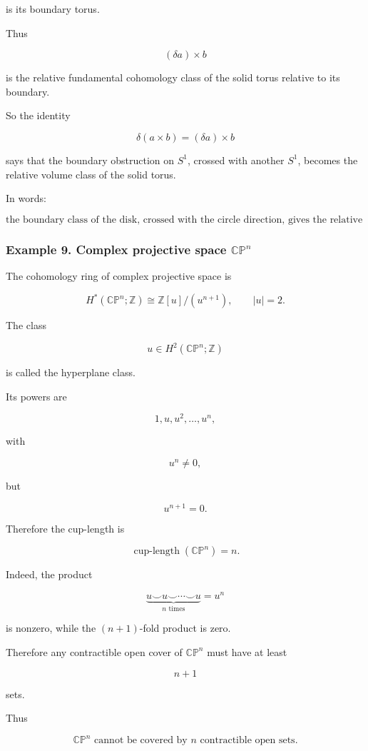 \documentclass[12pt,a4paper]{article}
\theoremstyle{notespace}
\begin{document}
is its boundary torus.

Thus

\[
(\delta a)\times b
\]

is the relative fundamental cohomology class of the solid torus relative to its boundary.

So the identity

\[
\boxed{
	\delta(a\times b)
	=
	(\delta a)\times b
}
\]

says that the boundary obstruction on \(S^1\), crossed with another \(S^1\), becomes the relative volume class of the solid torus.

In words:

\[
\boxed{
	\text{the boundary class of the disk, crossed with the circle direction, gives the relative top class of the solid torus.}
}
\]

\subsubsection{Example 9. Complex projective space \(\mathbb{CP}^n\)}

The cohomology ring of complex projective space is

\[
H^*(\mathbb{CP}^n;\mathbb Z)
\cong
\mathbb Z[u]/(u^{n+1}),
\qquad
|u|=2.
\]

The class

\[
u\in H^2(\mathbb{CP}^n;\mathbb Z)
\]

is called the hyperplane class.

Its powers are

\[
1,u,u^2,\dots,u^n,
\]

with

\[
u^n\neq 0,
\]

but

\[
u^{n+1}=0.
\]

Therefore the cup-length is

\[
\operatorname{cup\text{-}length}(\mathbb{CP}^n)=n.
\]

Indeed, the product

\[
\underbrace{u\smile u\smile\cdots\smile u}_{n\text{ times}}
=
u^n
\]

is nonzero, while the \((n+1)\)-fold product is zero.

Therefore any contractible open cover of \(\mathbb{CP}^n\) must have at least

\[
n+1
\]

sets.

Thus

\[
\boxed{
	\mathbb{CP}^n\text{ cannot be covered by }n\text{ contractible open sets.}
}
\]
\end{document}
